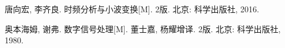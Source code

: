 \begin{refsectionmanual}
\item 唐向宏, 李齐良. 时频分析与小波变换[M]. 2版. 北京: 科学出版社, 2016.
\item 奥本海姆, 谢弗. 数字信号处理[M]. 董士嘉, 杨耀增译. 2版. 北京: 科学出版社, 1980.
\end{refsectionmanual}

